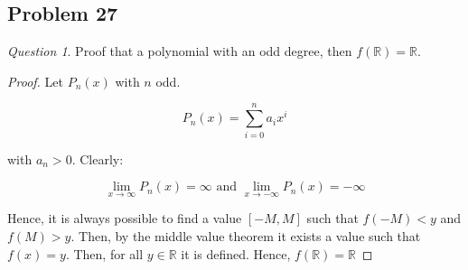 \documentclass[11pt]{article}
\theoremstyle{definition}
\theoremstyle{remark}
\theoremstyle{remark}
\newtheorem{question}{Question}
\newcommand{\R}{{\mathbb{R}}}
\newcommand{\ri}{\rightarrow}
\begin{document}
\subsection{Problem 27}
\begin{question}
  Proof that a polynomial with an odd degree, then $f(\R) = \R$.
\end{question}

\begin{proof}
  Let $P_n(x)$ with $n$ odd.

  \begin{equation*}
    P_n(x) = \sum_{i=0}^na_ix^i
  \end{equation*}

  with $a_n > 0$. Clearly:

  \begin{equation*}
    \lim_{x \ri \infty}P_n(x) = \infty \text{ and } \lim_{x \ri -\infty}P_n(x) = -\infty
  \end{equation*}

  Hence, it is always possible to find a value $[-M, M]$ such that
  $f(-M) < y$ and $f(M) > y$. Then, by the middle value theorem it
  exists a value such that $f(x) = y$. Then, for all $y \in \R$ it is
  defined. Hence, $f(\R) = \R$
\end{proof}
\end{document}

